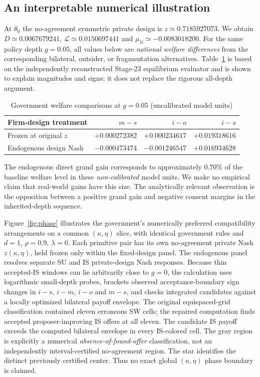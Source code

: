 \documentclass[11pt,a4paper]{article}
\theoremstyle{remark}\newtheorem{remark}[theorem]{Remark}
\newcommand{\N}{\mathrm{N}}\newcommand{\F}{\mathrm{F}}
\newcommand{\loss}{\mathcal L}\newcommand{\vect}[1]{\boldsymbol{#1}}
\begin{document}
\subsection{An interpretable numerical illustration}
At $\theta_0$ the no-agreement symmetric private design is $z\simeq0.7185927073$. We obtain $D\simeq0.0067679241$, $\loss\simeq0.0150697441$ and $\mu_{\N}\simeq-0.0083018200$. For the same policy depth $g=0.05$, all values below are \emph{national welfare differences} from the corresponding bilateral, outsider, or fragmentation alternatives. Table~\ref{tab:effects} is based on the independently reconstructed Stage-23 equilibrium evaluator and is shown to explain magnitudes and signs; it does not replace the rigorous all-depth argument.
\begin{table}[ht]
\centering\small
\caption{Government welfare comparisons at $g=0.05$ (uncalibrated model units)}\label{tab:effects}
\begin{tabular}{lrrr}
\toprule
Firm-design treatment&$m-s$&$i-o$&$i-s$\\
\midrule
Frozen at original $z$&$+0.000272382$&$+0.000234617$&$+0.019318616$\\
Endogenous design Nash&$-0.000473474$&$-0.001246547$&$+0.016934628$\\
\bottomrule
\end{tabular}
\end{table}
The endogenous direct grand gain corresponds to approximately $0.70\%$ of the baseline welfare level in these \emph{non-calibrated} model units. We make no empirical claim that real-world gains have this size. The analytically relevant observation is the opposition between a positive grand gain and negative consent margins in the inherited-depth sequence.

Figure~\ref{fig:phase} illustrates the government's numerically preferred compatibility arrangements on a common $(\kappa,\eta)$ slice, with identical government rules and $d=1$, $\rho=0.9$, $\lambda=0$. Each primitive pair has its own no-agreement private Nash $z(\kappa,\eta)$, held frozen only within the fixed-design panel. The endogenous panel resolves separate SU and IS private-design Nash responses. Because thin accepted-IS windows can lie arbitrarily close to $g=0$, the calculation uses logarithmic small-depth probes, brackets observed acceptance-boundary sign changes in $i-s$, $i-m$, $i-o$ and $m-s$, and checks integrated candidates against a locally optimized bilateral payoff envelope. The original equispaced-grid classification contained eleven erroneous SW cells; the repaired computation finds accepted proposer-improving IS offers at all eleven. The candidate IS payoff exceeds the computed bilateral envelope in every IS-colored cell. The gray region is explicitly a numerical \emph{absence-of-found-offer} classification, not an independently interval-certified no-agreement region. The star identifies the distinct previously certified center. Thus no exact global $(\kappa,\eta)$ phase boundary is claimed.
\end{document}
